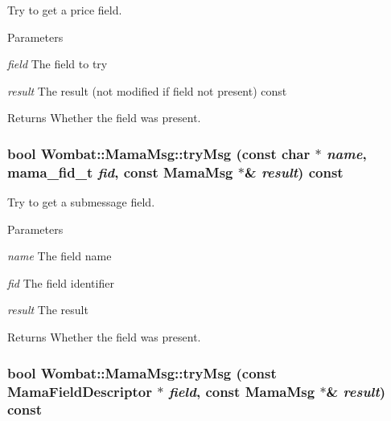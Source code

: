 Try to get a price field. 
\begin{DoxyParams}{Parameters}
\item[{\em field}]The field to try \item[{\em result}]The result (not modified if field not present) const \end{DoxyParams}
\begin{DoxyReturn}{Returns}
Whether the field was present. 
\end{DoxyReturn}
\hypertarget{classWombat_1_1MamaMsg_a857c57465eb999e8e6da21fa9b430880}{
\subsubsection[{tryMsg}]{\setlength{\rightskip}{0pt plus 5cm}bool Wombat::MamaMsg::tryMsg (const char $\ast$ {\em name}, \/  mama\_\-fid\_\-t {\em fid}, \/  const {\bf MamaMsg} $\ast$\& {\em result}) const}}
\label{classWombat_1_1MamaMsg_a857c57465eb999e8e6da21fa9b430880}


Try to get a submessage field. 
\begin{DoxyParams}{Parameters}
\item[{\em name}]The field name \item[{\em fid}]The field identifier \item[{\em result}]The result \end{DoxyParams}
\begin{DoxyReturn}{Returns}
Whether the field was present. 
\end{DoxyReturn}
\hypertarget{classWombat_1_1MamaMsg_a7fa5e237b99e21852ccfe1d2a35d66db}{
\subsubsection[{tryMsg}]{\setlength{\rightskip}{0pt plus 5cm}bool Wombat::MamaMsg::tryMsg (const {\bf MamaFieldDescriptor} $\ast$ {\em field}, \/  const {\bf MamaMsg} $\ast$\& {\em result}) const}}
\label{classWombat_1_1MamaMsg_a7fa5e237b99e21852ccfe1d2a35d66db}


